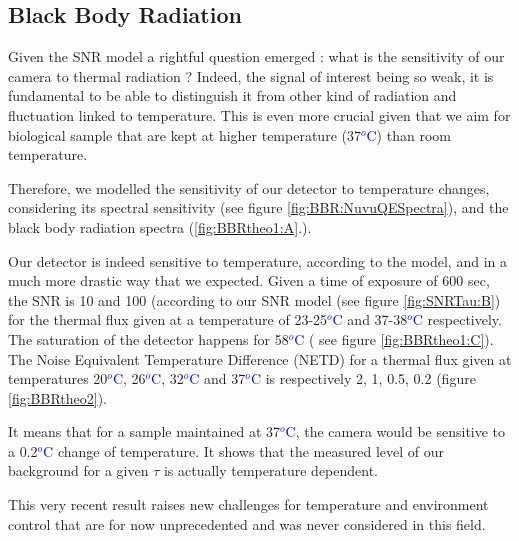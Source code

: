 \documentclass{article}
\begin{document}
\subsection{Black Body Radiation}

Given the SNR model a rightful question emerged : what is the sensitivity of our camera to thermal radiation ? Indeed, the signal of interest being so weak, it is fundamental to be able to distinguish it from other kind of radiation and fluctuation linked to temperature. This is even more crucial given that we aim for biological sample that are kept at higher temperature (37\textcolor{blue}{$^o$C}) than room temperature.\par

Therefore, we modelled the sensitivity of our detector to temperature changes, considering its spectral sensitivity (see figure \ref{fig:BBR:NuvuQESpectra}), and the black body radiation spectra (\ref{fig:BBRtheo1:A}.). \par
Our detector is indeed sensitive to temperature, according to the model, and in a much more drastic way that we expected.  Given a time of exposure of 600 sec, the SNR is 10 and 100 (according to our SNR model (see figure \ref{fig:SNRTau:B}) for the thermal flux given at a temperature of  23-25\textcolor{blue}{$^o$C} and 37-38\textcolor{blue}{$^o$C} respectively. The saturation of the detector happens for 58\textcolor{blue}{$^o$C} ( see figure \ref{fig:BBRtheo1:C}). The Noise Equivalent Temperature Difference (NETD) for a thermal flux given at temperatures 20\textcolor{blue}{$^o$C}, 26\textcolor{blue}{$^o$C}, 32\textcolor{blue}{$^o$C} and 37\textcolor{blue}{$^o$C} is respectively 2, 1, 0.5, 0.2 (figure \ref{fig:BBRtheo2}).\par
It means that for a sample maintained at 37\textcolor{blue}{$^o$C}, the camera would be sensitive to  a 0.2\textcolor{blue}{$^o$C} change of temperature. It shows that the measured level of our background for a given $\tau$ is actually temperature dependent.  \par
This very recent result raises new challenges for temperature and environment control that are for now unprecedented and was never considered in this field.
\end{document}

